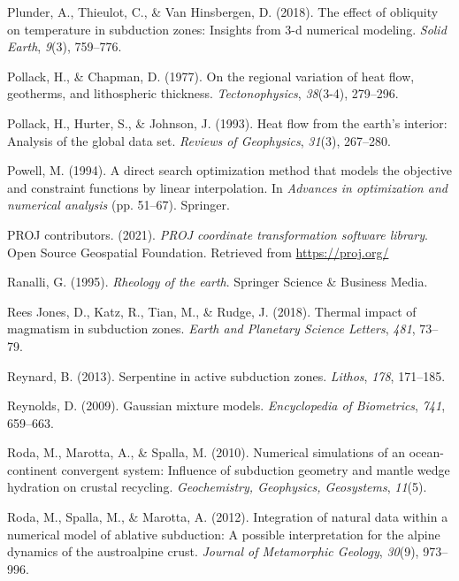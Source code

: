 \begin{CSLReferences}{1}{1}
\leavevmode{}%
Plunder, A., Thieulot, C., \& Van Hinsbergen, D. (2018). The effect of obliquity on temperature in subduction zones: Insights from 3-d numerical modeling. \emph{Solid Earth}, \emph{9}(3), 759--776.

\leavevmode{}%
Pollack, H., \& Chapman, D. (1977). On the regional variation of heat flow, geotherms, and lithospheric thickness. \emph{Tectonophysics}, \emph{38}(3-4), 279--296.

\leavevmode{}%
Pollack, H., Hurter, S., \& Johnson, J. (1993). Heat flow from the earth's interior: Analysis of the global data set. \emph{Reviews of Geophysics}, \emph{31}(3), 267--280.

\leavevmode{}%
Powell, M. (1994). A direct search optimization method that models the objective and constraint functions by linear interpolation. In \emph{Advances in optimization and numerical analysis} (pp. 51--67). Springer.

\leavevmode{}%
PROJ contributors. (2021). \emph{{PROJ} coordinate transformation software library}. Open Source Geospatial Foundation. Retrieved from \url{https://proj.org/}

\leavevmode{}%
Ranalli, G. (1995). \emph{Rheology of the earth}. Springer Science \& Business Media.

\leavevmode{}%
Rees Jones, D., Katz, R., Tian, M., \& Rudge, J. (2018). Thermal impact of magmatism in subduction zones. \emph{Earth and Planetary Science Letters}, \emph{481}, 73--79.

\leavevmode{}%
Reynard, B. (2013). Serpentine in active subduction zones. \emph{Lithos}, \emph{178}, 171--185.

\leavevmode{}%
Reynolds, D. (2009). Gaussian mixture models. \emph{Encyclopedia of Biometrics}, \emph{741}, 659--663.

\leavevmode{}%
Roda, M., Marotta, A., \& Spalla, M. (2010). Numerical simulations of an ocean-continent convergent system: Influence of subduction geometry and mantle wedge hydration on crustal recycling. \emph{Geochemistry, Geophysics, Geosystems}, \emph{11}(5).

\leavevmode{}%
Roda, M., Spalla, M., \& Marotta, A. (2012). Integration of natural data within a numerical model of ablative subduction: A possible interpretation for the alpine dynamics of the austroalpine crust. \emph{Journal of Metamorphic Geology}, \emph{30}(9), 973--996.


\end{CSLReferences}

